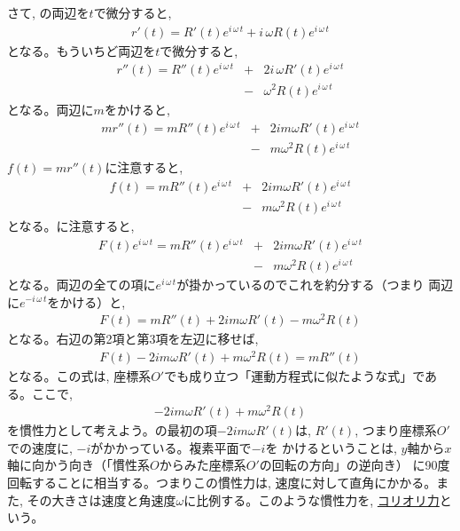 さて, の両辺を$t$で微分すると, 
\begin{eqnarray}r'(t)=R'(t)e^{i\,\omega\,t}+i\,\omega R(t)e^{i\,\omega\,t}\end{eqnarray}
となる。もういちど両辺を$t$で微分すると, 
\begin{eqnarray}r''(t)=R''(t)e^{i\,\omega\,t}&+&2i\,\omega R'(t)e^{i\,\omega\,t}\nonumber\\
                                            &-&\omega^2 R(t)e^{i\,\omega\,t}\end{eqnarray}
となる。両辺に$m$をかけると, 
\begin{eqnarray}mr''(t)=mR''(t)e^{i\,\omega\,t}&+&2im\omega R'(t)e^{i\,\omega\,t}\nonumber\\
                                            &-&m\omega^2 R(t)e^{i\,\omega\,t}\end{eqnarray}
$f(t)=mr''(t)$に注意すると, 
\begin{eqnarray}f(t)=mR''(t)e^{i\,\omega\,t}&+&2im\omega R'(t)e^{i\,\omega\,t}\nonumber\\
                                            &-&m\omega^2 R(t)e^{i\,\omega\,t}\end{eqnarray}
となる。に注意すると, 
\begin{eqnarray}F(t)e^{i\,\omega\,t}=mR''(t)e^{i\,\omega\,t}&+&2im\omega R'(t)e^{i\,\omega\,t}\nonumber\\
                                            &-&m\omega^2 R(t)e^{i\,\omega\,t}\end{eqnarray}
となる。両辺の全ての項に$e^{i\,\omega\,t}$が掛かっているのでこれを約分する（つまり
両辺に$e^{-i\,\omega\,t}$をかける）と, 
\begin{eqnarray}
F(t)=mR''(t)+2im\omega R'(t)-m\omega^2 R(t)
\end{eqnarray}
となる。右辺の第2項と第3項を左辺に移せば, 
\begin{eqnarray}
F(t)-2im\omega R'(t)+m\omega^2 R(t)=mR''(t)
\end{eqnarray}
となる。この式は, 座標系$O'$でも成り立つ「運動方程式に似たような式」である。ここで, 
\begin{eqnarray}
-2im\omega R'(t)+m\omega^2 R(t)\label{eq:rotinertf}
\end{eqnarray}
を慣性力として考えよう。の最初の項$-2im\omega R'(t)$は, 
$R'(t)$, つまり座標系$O'$での速度に, $-i$がかかっている。複素平面で$-i$を
かけるということは, $y$軸から$x$軸に向かう向き（「慣性系$O$からみた座標系$O'$の回転の方向」の逆向き）
に90度回転することに相当する。つまりこの慣性力は, 
速度に対して直角にかかる。また, その大きさは速度と角速度$\omega$に比例する。このような慣性力を, 
\underline{コリオリ力}という。

